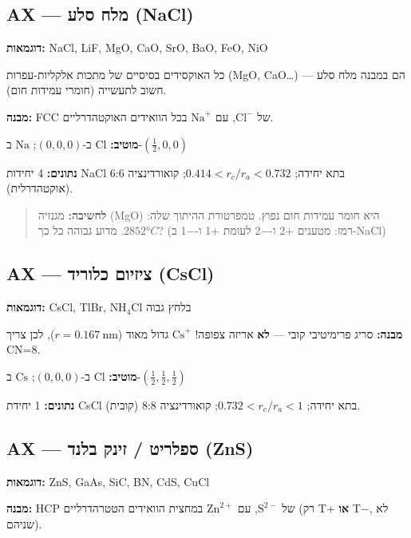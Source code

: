 \documentclass[
  hebrew,
  letterpaper,
  DIV=11,
  numbers=noendperiod]{scrreprt}
\begin{document}
\subsection{AX --- מלח סלע
(NaCl)}\label{ax-ux5deux5dcux5d7-ux5e1ux5dcux5e2-nacl}

\textbf{דוגמאות:} NaCl, LiF, MgO, CaO, SrO, BaO, FeO, NiO

כל האוקסידים בסיסיים של מתכות אלקליות-עפרות (MgO, CaO\ldots) הם במבנה
מלח סלע --- חשוב לתעשייה (חומרי עמידות חום).

\textbf{מבנה:} FCC של \(\text{Cl}^-\), עם \(\text{Na}^+\) בכל הוואידים
האוקטהדרליים.

\textbf{מוטיב:} \(\text{Cl}\) ב-\((0,0,0)\); \(\text{Na}\)
ב-\((\frac{1}{2},0,0)\)

\textbf{נתונים:} 4 יחידות NaCl בתא יחידה; \(0.414 < r_c/r_a < 0.732\);
קואורדינציה 6:6 (אוקטהדרלית).

\begin{quote}
\textbf{לחשיבה:} מגנזיה (MgO) היא חומר עמידות חום נפוץ. טמפרטורת ההיתוך
שלה: \(2852°C\). מדוע גבוהה כל כך? (רמז: מטענים +2 ו-−2 לעומת +1 ו-−1
ב-NaCl)
\end{quote}

\subsection{AX --- ציזיום כלוריד
(CsCl)}\label{ax-ux5e6ux5d9ux5d6ux5d9ux5d5ux5dd-ux5dbux5dcux5d5ux5e8ux5d9ux5d3-cscl}

\textbf{דוגמאות:} CsCl, TlBr, \(\text{NH}_4\text{Cl}\) בלחץ גבוה

\textbf{מבנה:} סריג פרימיטיבי קובי --- \textbf{לא} אריזה צפופה!
\(\text{Cs}^+\) גדול מאוד (\(r = 0.167\ \text{nm}\)), לכן צריך CN=8.

\textbf{מוטיב:} \(\text{Cl}\) ב-\((0,0,0)\); \(\text{Cs}\)
ב-\((\frac{1}{2},\frac{1}{2},\frac{1}{2})\)

\textbf{נתונים:} 1 יחידת CsCl בתא יחידה; \(0.732 < r_c/r_a < 1\);
קואורדינציה 8:8 (קובית).

\subsection{AX --- ספלריט / זינק בלנד
(ZnS)}\label{ax-ux5e1ux5e4ux5dcux5e8ux5d9ux5d8-ux5d6ux5d9ux5e0ux5e7-ux5d1ux5dcux5e0ux5d3-zns}

\textbf{דוגמאות:} ZnS, GaAs, SiC, BN, CdS, CuCl

\textbf{מבנה:} HCP של \(\text{S}^{2-}\), עם \(\text{Zn}^{2+}\) במחצית
הוואידים הטטרהדרליים (רק T+ \textbf{או} T−, לא שניהם).
\end{document}
